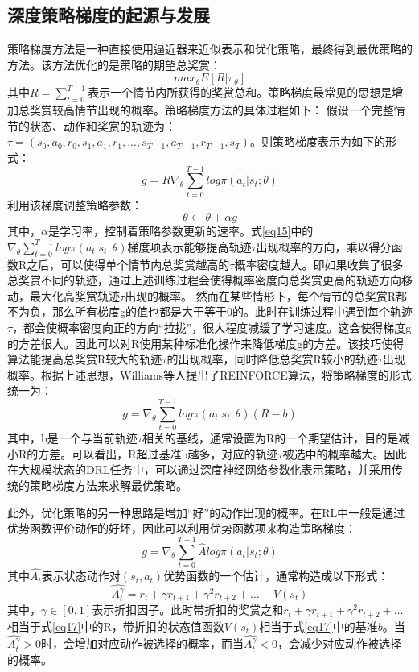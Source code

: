 \documentclass[bachelor]{thesis-uestc}
\begin{document}
	\subsection{深度策略梯度的起源与发展}\label{sec2}
	策略梯度方法是一种直接使用逼近器来近似表示和优化策略，最终得到最优策略的方法。该方法优化的是策略的期望总奖赏：
	\begin{equation}
		\label{eq14}
		max_{\theta}E[R|\pi_\theta]
	\end{equation}
	其中$R=\sum_{t=0}^{T-1}$表示一个情节内所获得的奖赏总和。策略梯度最常见的思想是增加总奖赏较高情节出现的概率。策略梯度方法的具体过程如下：
	假设一个完整情节的状态、动作和奖赏的轨迹为：$\tau=(s_0,a_0,r_0,s_1,a_1,r_1,...,s_{T-1},a_{T-1},r_{T-1},s_T)$。则策略梯度表示为如下的形式：
	\begin{equation}
		\label{eq15}
		g=R\nabla_\theta\sum_{t=0}^{T-1}log\pi(a_t|s_t;\theta)
	\end{equation}
	利用该梯度调整策略参数：
	\begin{equation}
		\label{eq16}
		\theta\leftarrow\theta+\alpha g
	\end{equation}
	其中，$\alpha$是学习率，控制着策略参数更新的速率。式\ref{eq15}中的$\nabla_\theta\sum_{t=0}^{T-1}log\pi(a_t|s_t;\theta)$梯度项表示能够提高轨迹$\tau$出现概率的方向，乘以得分函数R之后，可以使得单个情节内总奖赏越高的$\tau$概率密度越大。即如果收集了很多总奖赏不同的轨迹，通过上述训练过程会使得概率密度向总奖赏更高的轨迹方向移动，最大化高奖赏轨迹$\tau$出现的概率。
	然而在某些情形下，每个情节的总奖赏R都不为负，那么所有梯度g的值也都是大于等于0的。此时在训练过程中遇到每个轨迹$\tau$，都会使概率密度向正的方向“拉拢”，很大程度减缓了学习速度。这会使得梯度g的方差很大。因此可以对R使用某种标准化操作来降低梯度g的方差。该技巧使得算法能提高总奖赏R较大的轨迹$\tau$的出现概率，同时降低总奖赏R较小的轨迹$\tau$出现概率。根据上述思想，Williams等人\cite{williams1992simple}提出了REINFORCE算法，将策略梯度的形式统一为：
	\begin{equation}
		\label{eq17}
		g=\nabla_\theta\sum_{t=0}^{T-1}log\pi(a_t|s_t;\theta)(R-b)
	\end{equation}
	其中，b是一个与当前轨迹$\tau$相关的基线，通常设置为R的一个期望估计，目的是减小R的方差。可以看出，R超过基准b越多，对应的轨迹$\tau$被选中的概率越大。因此在大规模状态的DRL任务中，可以通过深度神经网络参数化表示策略，并采用传统的策略梯度方法来求解最优策略。
	
	此外，优化策略的另一种思路是增加“好”的动作出现的概率。在RL中一般是通过优势函数评价动作的好坏，因此可以利用优势函数项来构造策略梯度：
	\begin{equation}
		\label{eq18}
		g=\nabla_\theta\sum_{t=0}^{T-1}\hat{A}log\pi(a_t|s_t;\theta)
	\end{equation}
	其中$\hat{A_t}$表示状态动作对$(s_t,a_t)$优势函数的一个估计，通常构造成以下形式：
	\begin{equation}
		\label{eq19}
		\hat{A_t^\gamma}=r_t+\gamma r_{t+1}+\gamma^2 r_{t+2}+\dots-V(s_t)
	\end{equation}
	其中，$\gamma\in[0,1]$表示折扣因子。此时带折扣的奖赏之和$r_t+\gamma r_{t+1}+\gamma^2 r_{t+2}+\dots$相当于式\ref{eq17}中的R，带折扣的状态值函数$V(s_t)$相当于式\ref{eq17}中的基准$b$。当$\hat{A_t^\gamma}>0$时，会增加对应动作被选择的概率，而当$\hat{A_t^\gamma}<0$，会减少对应动作被选择的概率。
	
\end{document}
